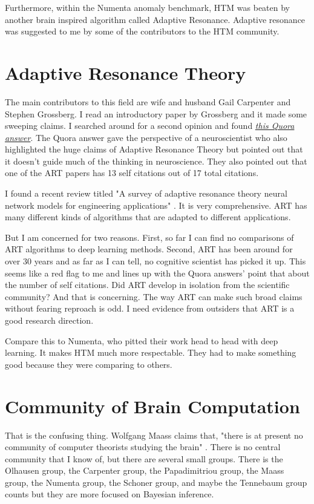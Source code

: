 \documentclass{article}
\begin{document}
Furthermore, within the Numenta anomaly benchmark, HTM was beaten by another brain inspired algorithm called Adaptive Resonance. Adaptive resonance was suggested to me by some of the contributors to the HTM community.

\section*{Adaptive Resonance Theory}

The main contributors to this field are wife and husband Gail Carpenter and Stephen Grossberg. I read an introductory paper by Grossberg and it made some sweeping claims. I searched around for a second opinion and found \textit{\href{https://qr.ae/pvFPks}{this Quora answer}}. The Quora answer gave the perspective of a neuroscientist who also highlighted the huge claims of Adaptive Resonance Theory but pointed out that it doesn't guide much of the thinking in neuroscience. They also pointed out that one of the ART papers has 13 self citations out of 17 total citations. 

I found a recent review titled "A survey of adaptive resonance theory neural network models for engineering applications" \cite{Britodasilva2019}. It is very comprehensive. ART has many different kinds of algorithms that are adapted to different applications.

But I am concerned for two reasons. First, so far I can find no comparisons of ART algorithms to deep learning methods. Second, ART has been around for over 30 years and as far as I can tell, no cognitive scientist has picked it up. This seems like a red flag to me and lines up with the Quora answers' point that about the number of self citations. Did ART develop in isolation from the scientific community?  And that is concerning. The way ART can make such broad claims without fearing reproach is odd. I need evidence from outsiders that ART is a good research direction.

Compare this to Numenta, who pitted their work head to head with deep learning. It makes HTM much more respectable. They had to make something good because they were comparing to others.

\section*{Community of Brain Computation}
That is the confusing thing. Wolfgang Maass claims that, "there is at present no community of computer theorists studying the brain" \cite{Maass2019}. There is no central community that I know of, but there are several small groups. There is the Olhausen group, the Carpenter group, the Papadimitriou group, the Maass group, the Numenta group, the Schoner group, and maybe the Tennebaum group counts but they are more focused on Bayesian inference.
\end{document}
